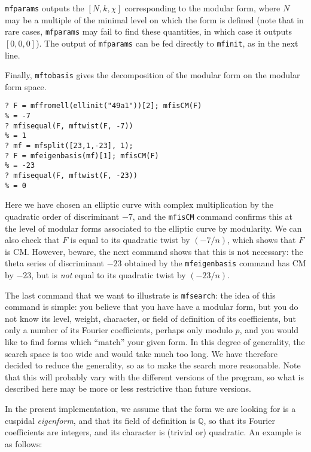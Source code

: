 \documentclass[11pt]{article}
\newcommand{\Q}{{\mathbb Q}}
\def\kbd#1{{\tt #1}}
\begin{document}
\kbd{mfparams} outputs the $[N,k,\chi]$ corresponding to the modular form,
where $N$ may be a multiple of the minimal level on which the form is defined
(note that in rare cases, \kbd{mfparams} may fail to find these quantities,
in which case it outputs $[0,0,0]$). The output of \kbd{mfparams} can be
fed directly to \kbd{mfinit}, as in the next line.

Finally, \kbd{mftobasis} gives the decomposition of the modular form
on the modular form space.

\medskip

\begin{verbatim}
? F = mffromell(ellinit("49a1"))[2]; mfisCM(F)
% = -7
? mfisequal(F, mftwist(F, -7))
% = 1
? mf = mfsplit([23,1,-23], 1);
? F = mfeigenbasis(mf)[1]; mfisCM(F)
% = -23
? mfisequal(F, mftwist(F, -23))
% = 0
\end{verbatim}

Here we have chosen an elliptic curve with complex multiplication by
the quadratic order of discriminant $-7$, and the \kbd{mfisCM} command
confirms this at the level of modular forms associated to the elliptic curve
by modularity. We can also check that $F$ is equal to its quadratic twist
by $(-7/n)$, which shows that $F$ is CM. However, beware, the next command
shows that this is not necessary: the theta series of discriminant $-23$
obtained by the \kbd{mfeigenbasis} command has CM by $-23$, but is \emph{not}
equal to its quadratic twist by $(-23/n)$.

\medskip

The last command that we want to illustrate is \kbd{mfsearch}: the idea
of this command is simple: you believe that you have have a modular form,
but you do not know its level, weight, character, or field of definition
of its coefficients, but only a number of its Fourier coefficients, perhaps
only modulo $p$, and you would like to find forms which ``match'' your
given form. In this degree of generality, the search space is too wide
and would take much too long. We have therefore decided to reduce
the generality, so as to make the search more reasonable. Note that this
will probably vary with the different versions of the program, so what is
described here may be more or less restrictive than future versions.

In the present implementation, we assume that the form we are looking
for is a cuspidal \emph{eigenform}, and that its field of definition is $\Q$,
so that its Fourier coefficients are integers, and its character is
(trivial or) quadratic. An example is as follows:
\end{document}
